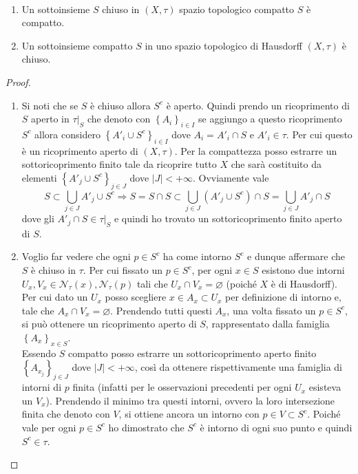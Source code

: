 \begin{theorem} \
	\begin{enumerate}
		\item Un sottoinsieme $S$ chiuso in $(X, \tau)$ spazio topologico compatto $S$ è compatto. 
		\item Un sottoinsieme compatto $S$ in uno spazio topologico di Hausdorff $(X,\tau)$ è chiuso. 
	\end{enumerate}
\end{theorem} 
\begin{proof} \
	\begin{enumerate}
		\item Si noti che se $S$ è chiuso allora $S^c$ è aperto. Quindi prendo un ricoprimento di $S$ aperto in $\tau|_S$ che denoto con $\left\{A_i\right\}_{i \in I}$ se aggiungo a questo ricoprimento $S^c$ allora considero $\left\{A'_i \cup S^c\right\}_{i \in I}$ dove $A_i = A'_i \cap S$ e $A'_i \in \tau$. Per cui questo è un ricoprimento aperto di $(X,\tau)$. Per la compattezza posso estrarre un sottoricoprimento finito tale da ricoprire tutto $X$ che sarà costituito da elementi $\left\{A'_j \cup S^c\right\}_{j \in J}$ dove $|J| < +\infty$. Ovviamente vale
		\begin{equation*}
			S \subset \bigcup_{j \in J} A'_j \cup S^c \Longrightarrow S = S \cap S \subset \bigcup_{j \in J} (A'_j \cup S^c) \cap S = \bigcup_{j \in J} A'_j  \cap S
		\end{equation*}
		dove gli $A'_j \cap S \in \tau|_S$ e quindi ho trovato un sottoricoprimento finito aperto di $S$.  
		\item 
		Voglio far vedere che ogni $p \in S^c$ ha come intorno $S^c$ e dunque affermare che $S$ è chiuso in $\tau$. Per cui fissato un $p \in S^c$, per ogni $x \in S$ esistono due intorni $U_x, V_x \in \mathcal{N}_\tau(x), \mathcal{N}_\tau(p)$ tali che $U_x \cap V_x = \varnothing$ (poiché $X$ è di Hausdorff). Per cui dato un $U_x$ posso scegliere $x \in A_x \subset U_x$ per definizione di intorno e, tale che $A_x \cap V_x = \varnothing$. Prendendo tutti questi $A_x$, una volta fissato un $p \in S^c$, si può ottenere un ricoprimento aperto di $S$, rappresentato dalla famiglia $\left\{A_x\right\}_{x \in S}$. \\ Essendo $S$ compatto posso estrarre un sottoricoprimento aperto finito  $\left\{A_{x_j}\right\}_{j \in J}$ dove $|J| < +\infty$, così da ottenere rispettivamente una famiglia di intorni di $p$ finita (infatti per le osservazioni precedenti per ogni $U_x$ esisteva un $V_x$). Prendendo il minimo tra questi intorni, ovvero la loro intersezione finita che denoto con $V$, si ottiene ancora un intorno con $p \in V \subset S^c$. Poiché vale per ogni $p \in S^c$ ho dimostrato che $S^c$ è intorno di ogni suo punto e quindi $S^c \in \tau$. 
	\end{enumerate}
\end{proof}

